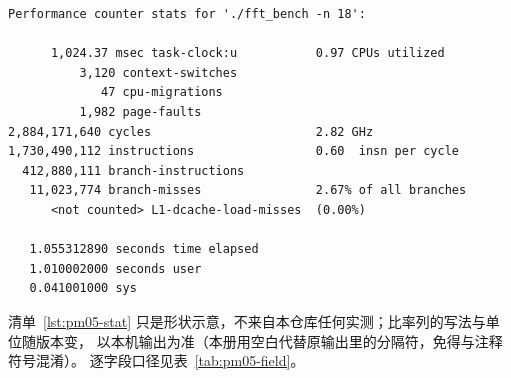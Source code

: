 \documentclass[12pt,a4paper,fontset=fandol]{ctexbook}
\newcommand{\Tp}[1]{\texttt{#1}}
\begin{document}
\begin{lstlisting}[style=outstyle, label={lst:pm05-stat},
  caption={形态示意：\Tp{perf stat} 输出的骨架（数值非本仓库实测值）}]
 Performance counter stats for './fft_bench -n 18':

      1,024.37 msec task-clock:u           0.97 CPUs utilized
          3,120 context-switches
             47 cpu-migrations
          1,982 page-faults
2,884,171,640 cycles                       2.82 GHz
1,730,490,112 instructions                 0.60  insn per cycle
  412,880,111 branch-instructions
   11,023,774 branch-misses                2.67% of all branches
      <not counted> L1-dcache-load-misses  (0.00%)

   1.055312890 seconds time elapsed
   1.010002000 seconds user
   0.041001000 sys
\end{lstlisting}

清单~\ref{lst:pm05-stat} 只是形状示意，不来自本仓库任何实测；比率列的写法与单位随版本变，
以本机输出为准（本册用空白代替原输出里的分隔符，免得与注释符号混淆）。
逐字段口径见表~\ref{tab:pm05-field}。
\end{document}

